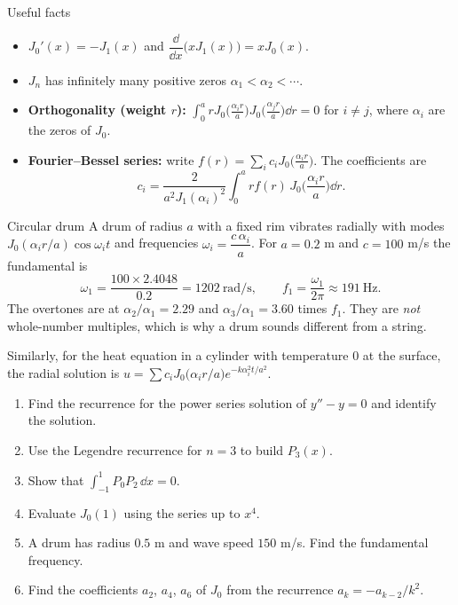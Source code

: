 \begin{defbox}{Useful facts}
\begin{itemize}
  \item $J_0'(x) = -J_1(x)$ \quad and \quad $\dfrac{\dd}{\dd x}\big(xJ_1(x)\big) = xJ_0(x)$.
  \item $J_n$ has infinitely many positive zeros $\alpha_1<\alpha_2<\cdots$.
  \item \textbf{Orthogonality (weight $r$):} $\displaystyle\int_0^a rJ_0\Big(\frac{\alpha_ir}{a}\Big)J_0\Big(\frac{\alpha_jr}{a}\Big)\dd r = 0$ for $i\ne j$, where $\alpha_i$ are the zeros of $J_0$.
  \item \textbf{Fourier--Bessel series:} write $f(r) = \displaystyle\sum_{i}c_iJ_0\Big(\frac{\alpha_ir}{a}\Big)$. The coefficients are
  \[ c_i = \frac{2}{a^2J_1(\alpha_i)^2}\int_0^arf(r)\,J_0\Big(\frac{\alpha_ir}{a}\Big)\dd r. \]
\end{itemize}
\end{defbox}

\begin{examplebox}{Circular drum}
A drum of radius $a$ with a fixed rim vibrates radially with modes $J_0(\alpha_ir/a)\cos\omega_it$ and frequencies $\omega_i = \dfrac{c\,\alpha_i}{a}$. For $a=0.2$ m and $c = 100$ m/s the fundamental is
\[ \omega_1 = \frac{100\times2.4048}{0.2} = 1202\ \text{rad/s}, \qquad f_1 = \frac{\omega_1}{2\pi}\approx 191\ \text{Hz}. \]
The overtones are at $\alpha_2/\alpha_1 = 2.29$ and $\alpha_3/\alpha_1=3.60$ times $f_1$. They are \emph{not} whole-number multiples, which is why a drum sounds different from a string.
\end{examplebox}

Similarly, for the heat equation in a cylinder with temperature $0$ at the surface, the radial solution is $u = \sum c_iJ_0\big(\alpha_ir/a\big)e^{-k\alpha_i^2t/a^2}$.

\begin{practicebox}
\begin{enumerate}
  \item Find the recurrence for the power series solution of $y''-y=0$ and identify the solution.
  \item Use the Legendre recurrence for $n=3$ to build $P_3(x)$.
  \item Show that $\displaystyle\int_{-1}^1P_0P_2\,\dd x = 0$.
  \item Evaluate $J_0(1)$ using the series up to $x^4$.
  \item A drum has radius $0.5$ m and wave speed $150$ m/s. Find the fundamental frequency.
  \item Find the coefficients $a_2$, $a_4$, $a_6$ of $J_0$ from the recurrence $a_k=-a_{k-2}/k^2$.
\end{enumerate}
\end{practicebox}

